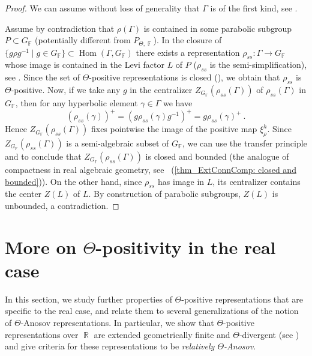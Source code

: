 \documentclass{amsart}
\theoremstyle{plain}
\theoremstyle{definition}
\DeclareMathOperator{\Hom}{Hom}
\DeclareMathOperator{\Fb}{{\mathbb{F}}}
\DeclareMathOperator{\Rb}{{\mathbb{R}}}
\newcommand{\1}{\mathbf{1}}
\begin{document}
\begin{proof}
    We can assume without loss of generality that $\Gamma$ is of the first kind, see .
    
    Assume by contradiction that $\rho(\Gamma)$ is contained in some parabolic subgroup $P \subset G_{\Fb}$ (potentially different from $P_{\Theta,\Fb}$).
    In the closure of $\{g \rho g^{-1}\mid g\in G_{\Fb}\} \subset \Hom(\Gamma,G_{\Fb})$ there exists a representation $\rho_{ss} \colon \Gamma \to G_{\Fb}$ whose image is contained in the Levi factor $L$ of $P$ ($\rho_{ss}$ is the semi-simplification), see .
    Since the set of $\Theta$-positive representations is closed (), we obtain that $\rho_{ss}$ is $\Theta$-positive.
    Now, if we take any $g$ in the centralizer $Z_{G_{\Fb}}(\rho_{ss}(\Gamma))$ of $\rho_{ss}(\Gamma)$ in $G_{\Fb}$, then for any hyperbolic element $\gamma \in \Gamma$ we have 
    \[(\rho_{ss}(\gamma))^+ = (g \rho_{ss}(\gamma) g^{-1})^+ = g \rho_{ss}(\gamma)^+~.\]
    Hence $Z_{G_{\Fb}}(\rho_{ss}(\Gamma))$ fixes pointwise the image of the positive map $\xi^h_\rho$.
    Since\break $Z_{G_{\Fb}}(\rho_{ss}(\Gamma))$ is a semi-algebraic subset of $G_{\Fb}$, we can use the transfer principle and \cite[Theorem 1.6]{guichard2025generalizing} to conclude that $Z_{G_{\Fb}}(\rho_{ss}(\Gamma))$ is closed and bounded (the analogue of compactness in real algebraic geometry, see ~(\ref{thm_ExtConnComp: closed and bounded})).
    On the other hand, since $\rho_{ss}$ has image in $L$, its centralizer contains the center $Z(L)$ of $L$. By construction of parabolic subgroups, $Z(L)$ is unbounded, a contradiction.
\end{proof}


\section{%
\texorpdfstring{%
More on $\Theta$-positivity in the real case}%
{More on Theta-positivity in the real case}}
\label{s: Real case}


In this section, we study further properties of $\Theta$-positive representations that are specific to the real case, and relate them to several generalizations of the notion of $\Theta$-Anosov representations.
In particular, we show that $\Theta$-positive representations over $\Rb$ are extended geometrically finite and $\Theta$-divergent (see ) and give criteria for these representations to be  \emph{relatively $\Theta$-Anosov}.
\end{document}
